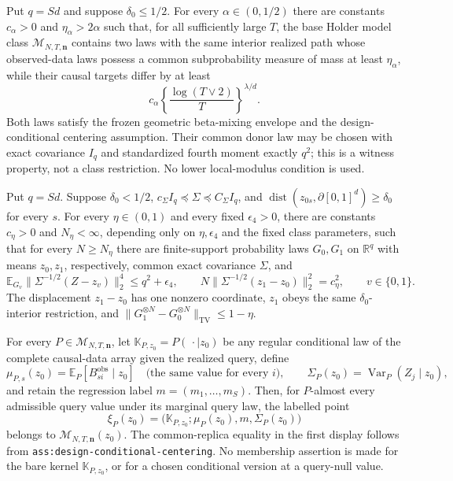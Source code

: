 Put \(q=Sd\) and suppose \(\delta_0\le1/2\).  For every
\(\alpha\in(0,1/2)\) there are constants \(c_\alpha>0\) and
\(\eta_\alpha>2\alpha\) such that, for all sufficiently large \(T\), the
base Holder model class \(\mathcal M_{N,T,\mathbf n}\) contains two laws
with the same interior realized path whose observed-data laws possess a
common subprobability measure of mass at least \(\eta_\alpha\), while their
causal targets differ by at least
\[
 c_\alpha\left\{\frac{\log(T\vee2)}{T}\right\}^{\lambda/d}.
\]
Both laws satisfy the frozen geometric beta-mixing envelope and the
design-conditional centering assumption.  Their common donor law may be
chosen with exact covariance \(I_q\) and standardized fourth moment exactly
\(q^2\); this is a witness property, not a class restriction.  No lower
local-modulus condition is used.

Put \(q=Sd\).  Suppose \(\delta_0<1/2\),
\(c_\Sigma I_q\preceq\Sigma\preceq C_\Sigma I_q\), and
\(\operatorname{dist}(z_{0s},\partial[0,1]^d)\ge\delta_0\) for every \(s\).
For every \(\eta\in(0,1)\) and every fixed \(\epsilon_4>0\), there are
constants \(c_\eta>0\) and \(N_\eta<\infty\), depending only on
\(\eta,\epsilon_4\) and the fixed class parameters, such that for every
\(N\ge N_\eta\) there are finite-support probability laws \(G_0,G_1\) on
\(\mathbb R^q\) with means \(z_0,z_1\), respectively, common exact
covariance \(\Sigma\), and
\[
 \mathbb E_{G_v}\|\Sigma^{-1/2}(Z-z_v)\|_2^4\le q^2+\epsilon_4,
 \qquad
 N\|\Sigma^{-1/2}(z_1-z_0)\|_2^2=c_\eta^2,
 \qquad v\in\{0,1\}.
\]
The displacement \(z_1-z_0\) has one nonzero coordinate, \(z_1\) obeys the
same \(\delta_0\)-interior restriction, and
\(\|G_1^{\otimes N}-G_0^{\otimes N}\|_{\mathrm{TV}}\le1-\eta\).

For every \(P\in\mathcal M_{N,T,\mathbf n}\), let
\(\mathbb K_{P,z_0}=P(\,\cdot\mid z_0)\) be any regular conditional law of
the complete causal-data array given the realized query, define
\[
 \mu_{P,s}(z_0)=\mathbb E_P[B_{si}^{\mathrm{obs}}\mid z_0]
 \quad\text{(the same value for every \(i\))},
 \qquad
 \Sigma_P(z_0)=\operatorname{Var}_P(Z_j\mid z_0),
\]
and retain the regression label \(m=(m_1,\ldots,m_S)\).  Then, for
\(P\)-almost every admissible query value under its marginal query law, the
labelled point
\[
 \xi_P(z_0)=\bigl(\mathbb K_{P,z_0};\mu_P(z_0),m,
                         \Sigma_P(z_0)\bigr)
\]
belongs to \(\mathcal M_{N,T,\mathbf n}(z_0)\).  The common-replica equality
in the first display follows from \texttt{ass:design-conditional-centering}.
No membership assertion is made for the bare kernel \(\mathbb K_{P,z_0}\),
or for a chosen conditional version at a query-null value.

